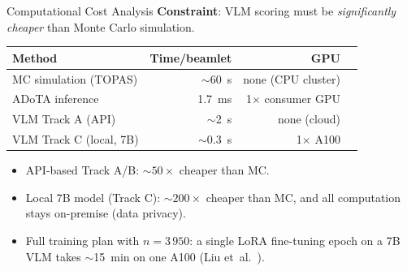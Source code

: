 \documentclass[aspectratio=169, 10pt]{beamer}
\begin{document}
\begin{frame}{Computational Cost Analysis}
  \textbf{Constraint}: VLM scoring must be \emph{significantly cheaper}
  than Monte Carlo simulation.

  \vspace{6pt}
  \begin{center}
  \renewcommand{\arraystretch}{1.3}
  {\small
  \begin{tabular}{@{}l r r r@{}}
    \toprule
    \textbf{Method} & \textbf{Time/beamlet} & \textbf{GPU} \\
    \midrule
    MC simulation (TOPAS)
      & $\sim$\SI{60}{s}  & none (CPU cluster)  \\
    ADoTA inference
      & \SI{1.7}{ms}      & 1$\times$ consumer GPU   \\
    VLM Track A (API)
      & $\sim$\SI{2}{s}   & none (cloud)       \\
    VLM Track C (local, 7B)
      & $\sim$\SI{0.3}{s} & 1$\times$ A100     \\
    \bottomrule
  \end{tabular}
  }
  \end{center}

  \vspace{6pt}
  \begin{itemize}
    \item API-based Track A/B: ${\sim}50\times$ cheaper than MC.
    \item Local 7B model (Track C): ${\sim}200\times$ cheaper than MC,
          and all computation stays on-premise (data privacy).
    \item Full training plan with $n{=}3\,950$: a single LoRA
          fine-tuning epoch on a 7B VLM takes ${\sim}$\SI{15}{min}
          on one A100 (Liu et~al.~\cite{liu2024visual}).
  \end{itemize}
\end{frame}
\end{document}

